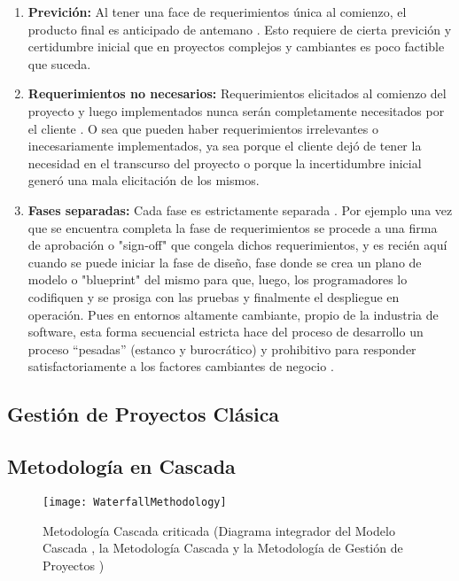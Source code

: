 \begin{enumerate}

\item \textbf{Previción:} Al tener una face de requerimientos única al comienzo, el producto final es anticipado de antemano \cite{Scrum-Institute-2015}. Esto requiere de cierta previción y certidumbre inicial que en proyectos complejos y cambiantes es poco factible que suceda.

\item \textbf{Requerimientos no necesarios:} Requerimientos elicitados al comienzo del proyecto y luego implementados nunca serán completamente necesitados por el cliente \cite{Scrum-Institute-2015}. O sea que pueden haber requerimientos irrelevantes o inecesariamente implementados, ya sea porque el cliente dejó de tener la necesidad en el transcurso del proyecto o porque la incertidumbre inicial generó una mala elicitación de los mismos.

\item \textbf{Fases separadas:} Cada fase es estrictamente separada \cite{Scrum-Institute-2015}. Por ejemplo una vez que se encuentra completa la fase de requerimientos se procede a una firma de aprobación o "sign-off" que congela dichos requerimientos, y es recién aquí cuando se puede iniciar la fase de diseño, fase donde se crea un plano de modelo o "blueprint" del mismo para que, luego, los programadores lo codifiquen y se prosiga con las pruebas y finalmente el despliegue en operación. Pues en entornos altamente cambiante, propio de la industria de software, esta forma secuencial estricta hace del proceso de desarrollo un proceso “pesadas” (estanco y burocrático) y prohibitivo para responder satisfactoriamente a los factores cambiantes de negocio \cite{Martin-Alaimo-2014}.

\end{enumerate}

\subsection{Gestión de Proyectos Clásica}

\subsection{Metodología en Cascada}

\begin{figure}[h]
  \centering
  \texttt{[image: WaterfallMethodology]}
  \caption{Metodología Cascada criticada (Diagrama integrador del Modelo Cascada \cite{Winston-Royce-1970}, la Metodología Cascada \cite{Ken-Schwaber-1995} y la Metodología de Gestión de Proyectos \cite{PMBOK-1996})}
  \centering
  \label{fig:WaterfallMethodology} %
\end{figure}
